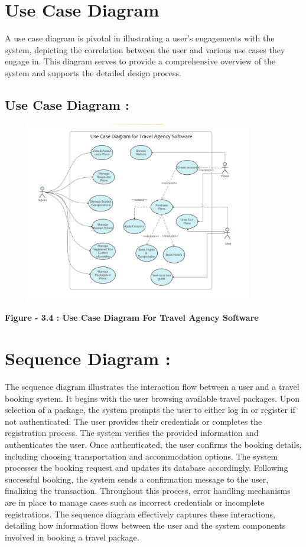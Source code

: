 \documentclass{scrreprt}
\begin{document}
\section{Use Case Diagram}

A use case diagram is pivotal in illustrating a user's engagements with the system, depicting the correlation between the user and various use cases they engage in. This diagram serves to provide a comprehensive overview of the system and supports the detailed design process.

\subsection *{ Use Case Diagram : }
{\includegraphics[width=450px, height=300px]{uml.png}}

\begin{center}
    \parbox{0.8\textwidth}{ 
        \centering
        \textbf{Figure - 3.4 : Use Case Diagram For Travel Agency Software}
    }
\end{center}

\section{ Sequence Diagram : }

The sequence diagram illustrates the interaction flow between a user and a travel booking system. It begins with the user browsing available travel packages. Upon selection of a package, the system prompts the user to either log in or register if not authenticated. The user provides their credentials or completes the registration process. The system verifies the provided information and authenticates the user. Once authenticated, the user confirms the booking details, including choosing transportation and accommodation options. The system processes the booking request and updates its database accordingly. Following successful booking, the system sends a confirmation message to the user, finalizing the transaction. Throughout this process, error handling mechanisms are in place to manage cases such as incorrect credentials or incomplete registrations. The sequence diagram effectively captures these interactions, detailing how information flows between the user and the system components involved in booking a travel package.
\end{document}
